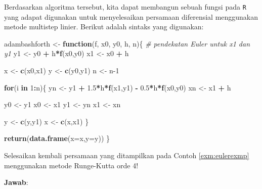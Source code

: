 \documentclass[]{book}
\newenvironment{Shaded}{\begin{snugshade}}{\end{snugshade}}
\newcommand{\CommentTok}[1]{\textcolor[rgb]{0.56,0.35,0.01}{\textit{#1}}}
\newcommand{\ControlFlowTok}[1]{\textcolor[rgb]{0.13,0.29,0.53}{\textbf{#1}}}
\newcommand{\DataTypeTok}[1]{\textcolor[rgb]{0.13,0.29,0.53}{#1}}
\newcommand{\DecValTok}[1]{\textcolor[rgb]{0.00,0.00,0.81}{#1}}
\newcommand{\FloatTok}[1]{\textcolor[rgb]{0.00,0.00,0.81}{#1}}
\newcommand{\KeywordTok}[1]{\textcolor[rgb]{0.13,0.29,0.53}{\textbf{#1}}}
\newcommand{\NormalTok}[1]{#1}
\newcommand{\OperatorTok}[1]{\textcolor[rgb]{0.81,0.36,0.00}{\textbf{#1}}}
\newcommand{\StringTok}[1]{\textcolor[rgb]{0.31,0.60,0.02}{#1}}
\theoremstyle{definition}
\theoremstyle{definition}
\theoremstyle{definition}
\theoremstyle{remark}
\let\BeginKnitrBlock\begin \let\EndKnitrBlock\end
\begin{document}
Berdasarkan algoritma tersebut, kita dapat membangun sebuah fungsi pada \texttt{R} yang adapat digunakan untuk menyelesaikan persamaan diferensial menggunakan metode multistep linier. Berikut adalah sintaks yang digunakan:

\begin{Shaded}
\begin{Highlighting}[]
\NormalTok{adambashforth <-}\StringTok{ }\ControlFlowTok{function}\NormalTok{(f, x0, y0, h, n)\{}
  \CommentTok{# pendekatan Euler untuk x1 dan y1}
\NormalTok{  y1 <-}\StringTok{ }\NormalTok{y0 }\OperatorTok{+}\StringTok{ }\NormalTok{h}\OperatorTok{*}\KeywordTok{f}\NormalTok{(x0,y0)}
\NormalTok{  x1 <-}\StringTok{ }\NormalTok{x0 }\OperatorTok{+}\StringTok{ }\NormalTok{h}
  
\NormalTok{  x <-}\StringTok{ }\KeywordTok{c}\NormalTok{(x0,x1)}
\NormalTok{  y <-}\StringTok{ }\KeywordTok{c}\NormalTok{(y0,y1)}
\NormalTok{  n <-}\StringTok{ }\NormalTok{n}\DecValTok{-1}
  
  \ControlFlowTok{for}\NormalTok{(i }\ControlFlowTok{in} \DecValTok{1}\OperatorTok{:}\NormalTok{n)\{}
\NormalTok{    yn <-}\StringTok{ }\NormalTok{y1 }\OperatorTok{+}\StringTok{ }\FloatTok{1.5}\OperatorTok{*}\NormalTok{h}\OperatorTok{*}\KeywordTok{f}\NormalTok{(x1,y1) }\OperatorTok{-}\StringTok{ }\FloatTok{0.5}\OperatorTok{*}\NormalTok{h}\OperatorTok{*}\KeywordTok{f}\NormalTok{(x0,y0)}
\NormalTok{    xn <-}\StringTok{ }\NormalTok{x1 }\OperatorTok{+}\StringTok{ }\NormalTok{h}
    
\NormalTok{    y0 <-}\StringTok{ }\NormalTok{y1}
\NormalTok{    x0 <-}\StringTok{ }\NormalTok{x1}
\NormalTok{    y1 <-}\StringTok{ }\NormalTok{yn}
\NormalTok{    x1 <-}\StringTok{ }\NormalTok{xn}
    
\NormalTok{    y <-}\StringTok{ }\KeywordTok{c}\NormalTok{(y,y1)}
\NormalTok{    x <-}\StringTok{ }\KeywordTok{c}\NormalTok{(x,x1)}
\NormalTok{  \}}
  
  \KeywordTok{return}\NormalTok{(}\KeywordTok{data.frame}\NormalTok{(}\DataTypeTok{x=}\NormalTok{x,}\DataTypeTok{y=}\NormalTok{y))}
\NormalTok{\}}
\end{Highlighting}
\end{Shaded}

\BeginKnitrBlock{example}
\protect\hypertarget{exm:adamexmp}{}{\label{exm:adamexmp} }Selesaikan kembali persamaan yang ditampilkan pada Contoh \ref{exm:eulerexmp} menggunakan metode Runge-Kutta orde 4!
\EndKnitrBlock{example}

\textbf{Jawab}:
\end{document}
